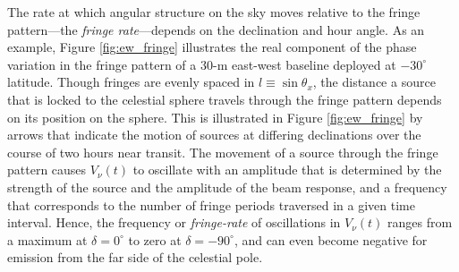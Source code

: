 \documentclass[twocolumn,apj,numberedappendix]{emulateapj}
\begin{document}
The rate at which angular structure on the sky moves relative to the fringe pattern---the \emph{fringe rate}---depends on the declination and hour angle. 
%
%
As an example, Figure \ref{fig:ew_fringe} illustrates the real component of the phase
variation in the fringe pattern of a 30-m east-west baseline deployed at $-30^\circ$ latitude.
Though fringes are evenly spaced in $l\equiv\sin\theta_x$, the distance a source that is locked to the celestial
sphere travels through the fringe pattern depends on its position on the sphere. This is illustrated in Figure
\ref{fig:ew_fringe} by arrows that indicate the motion of sources at differing declinations over the course
of two hours near transit.  The movement of a source through the fringe pattern causes $V_\nu(t)$ to oscillate
with an amplitude that is determined by the strength of the source and the amplitude of the beam response,
and a frequency that corresponds to the number of fringe periods traversed in a given time interval.  Hence, the frequency or {\it fringe-rate} of oscillations in $V_\nu(t)$
ranges from a maximum at $\delta=0^\circ$ to zero at $\delta=-90^\circ$, and can even become negative
for emission from the far side of the celestial pole.
\end{document}
